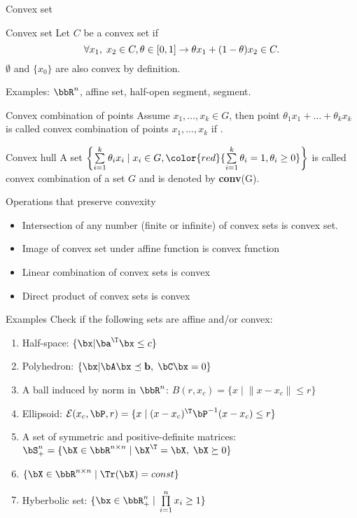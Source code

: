 \documentclass[12pt,russian]{beamer}
\begin{document}
\begin{frame}{Convex set}
\small
\begin{block}{Convex set}
Let $C$ be a convex set if 
\vspace{-4mm}
\[
\forall x_1, \; x_2 \in C, \theta \in [0, 1] \rightarrow \theta x_1 + (1 - \theta)x_2 \in C.
\vspace{-4mm}
\]
$\emptyset$ and $\{ x_0 \}$ are also convex by definition.
\end{block}
Examples: $\bbR^n$, affine set, half-open segment, segment.

\begin{block}{Convex combination of points}
Assume $x_1, \ldots, x_k \in G$, then point $\theta_1 x_1 + \ldots + \theta_k x_k$ is called convex combination of points $x_1,\ldots,x_k$ if {}.
\end{block}

\begin{block}{Convex hull}
A set $\left\{ \sum\limits_{i=1}^k \theta_i x_i \; | \; x_i \in G, {\color{red}{\sum\limits_{i=1}^k \theta_i = 1, \theta_i \geq 0}} \right\}$ is called convex combination of a set $G$ and is denoted by \textbf{conv}(G).
\end{block}

\end{frame}

\begin{frame}{Operations that preserve convexity}
\begin{itemize}
\item Intersection of any number (finite or infinite) of convex sets is convex set.
\item Image of convex set under affine function is convex function
\item Linear combination of convex sets is convex
\item Direct product of convex sets is convex
\end{itemize}
\end{frame}

\begin{frame}{Examples}
Check if the following sets are affine and/or convex:
\begin{enumerate}
\item Half-space: $\{ \bx | \ba^{\T} \bx \leq c \}$
\item Polyhedron: $\{ \bx | \bA\bx \preceq \mathbf{b}, \; \bC\bx = 0 \}$
\item A ball induced by norm in $\bbR^n$: $B(r, x_c) = \{ x \; | \; \| x - x_c \| \leq r \}$
\item Ellipsoid: $\mathcal{E}(x_c, \bP, r) = \{ x \; | \; (x - x_c)^{\T}\bP^{-1} (x - x_c) \leq r \}$
\item A set of symmetric and positive-definite matrices: $\bS^n_+ = \{ \bX \in \bbR^{n \times n} \; | \; \bX^{\T} = \bX, \; \bX \succeq 0 \}$
\item $\{ \bX \in \bbR^{n \times n} \; | \; \Tr(\bX) = const \}$
\item Hyberbolic set: $\{ \bx \in \bbR^n_+ \; | \; \prod\limits_{i=1}^n x_i \geq 1 \}$
\end{enumerate}
\end{frame}
\end{document}
